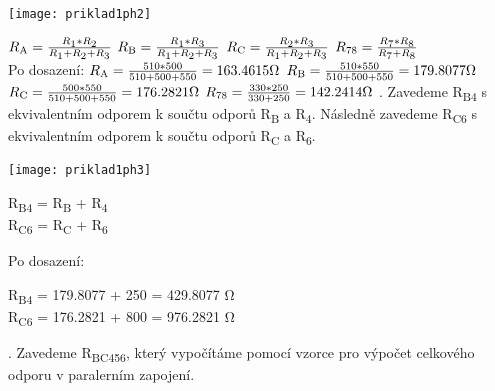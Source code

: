 \documentclass[12pt,a4paper]{article} %
\begin{document}
	    \centerline{
		\texttt{[image: priklad1ph2]}
		}
		\medskip
		\(
		\\R\textsubscript{A} = \frac{R\textsubscript{1}*R\textsubscript{2}}{R\textsubscript{1}+R\textsubscript{2}+R\textsubscript{3}}
	    \)
	    \medskip
		\(
		\\R\textsubscript{B} = \frac{R\textsubscript{1}*R\textsubscript{3}}{R\textsubscript{1}+R\textsubscript{2}+R\textsubscript{3}}
	    \)
	    \medskip
	    \(
		\\R\textsubscript{C} = \frac{R\textsubscript{2}*R\textsubscript{3}}{R\textsubscript{1}+R\textsubscript{2}+R\textsubscript{3}}
	    \)
	    \medskip
	    \(
		\\R\textsubscript{78} = \frac{R\textsubscript{7} * R\textsubscript{8}}{R\textsubscript{7} + R\textsubscript{8}}
	    \)
	    \bigskip
	    \\Po dosazení: 
	    \(
		\\R\textsubscript{A} = \frac{510*500}{510+500+550} = 163.4615 \si{\ohm}
	    \)
	    \medskip
		\(
		\\R\textsubscript{B} = \frac{510*550}{510+500+550} = 179.8077 \si{\ohm}
	    \)
	    \medskip
	    \(
		\\R\textsubscript{C} = \frac{500*550}{510+500+550} = 176.2821 \si{\ohm}
	    \)
	    \medskip
	    \(
		\\R\textsubscript{78} = \frac{330 * 250}{330 + 250} = 142.2414 \si{\ohm}
	    \)
        .  Zavedeme R\textsubscript{B4} s ekvivalentním odporem k součtu odporů R\textsubscript{B} a R\textsubscript{4}. Následně zavedeme R\textsubscript{C6} s ekvivalentním odporem k součtu odporů R\textsubscript{C} a R\textsubscript{6}.
	    \medskip
	    	    
	    \centerline{
		\texttt{[image: priklad1ph3]}
		}
	    \medskip
	    
	    R\textsubscript{B4} = R\textsubscript{B} + R\textsubscript{4} 
	    \\R\textsubscript{C6} = R\textsubscript{C} + R\textsubscript{6}
	    \bigskip
	    
	    Po dosazení:
	    
	    R\textsubscript{B4} = 179.8077 + 250 = 429.8077 \si{\ohm}
	    \\R\textsubscript{C6} = 176.2821 + 800 = 976.2821 \si{\ohm}
	    \bigskip
	    
	    . Zavedeme R\textsubscript{BC456}, který vypočítáme pomocí vzorce pro výpočet celkového odporu v paralerním zapojení.
	    \medskip
	    	    
\end{document}
